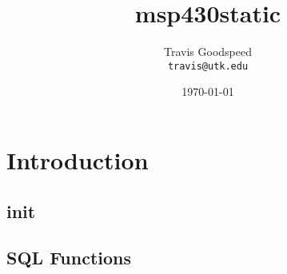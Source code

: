 \documentclass[]{book}
\title{msp430static}
\author{Travis Goodspeed\\{\tt travis@utk.edu}}
\date{\today}
\begin{document}
\maketitle

\chapter{Introduction}

\section{init}


\appendix

\section{SQL Functions}

\printindex
\end{document}
